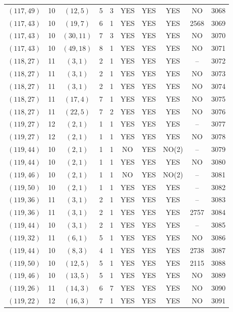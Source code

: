 \begin{longtable}{|c|c|c|c|c|c|c|c|c|c|}
$(117, 49)$ & 10 & $(12, 5)$ & 5 & 3 & YES & YES & YES & NO & 3068\\
$(117, 43)$ & 10 & $(19, 7)$ & 6 & 1 & YES & YES & YES & 2568 & 3069\\
$(117, 43)$ & 10 & $(30, 11)$ & 7 & 3 & YES & YES & YES & NO & 3070\\
$(117, 43)$ & 10 & $(49, 18)$ & 8 & 1 & YES & YES & YES & NO & 3071\\
$(118, 27)$ & 11 & $(3, 1)$ & 2 & 1 & YES & YES & YES & -- & 3072\\
$(118, 27)$ & 11 & $(3, 1)$ & 2 & 1 & YES & YES & YES & NO & 3073\\
$(118, 27)$ & 11 & $(3, 1)$ & 2 & 1 & YES & YES & YES & NO & 3074\\
$(118, 27)$ & 11 & $(17, 4)$ & 7 & 1 & YES & YES & YES & NO & 3075\\
$(118, 27)$ & 11 & $(22, 5)$ & 7 & 2 & YES & YES & YES & NO & 3076\\
$(119, 27)$ & 12 & $(2, 1)$ & 1 & 1 & YES & YES & YES & -- & 3077\\
$(119, 27)$ & 12 & $(2, 1)$ & 1 & 1 & YES & YES & YES & NO & 3078\\
$(119, 44)$ & 10 & $(2, 1)$ & 1 & 1 & NO & YES & NO(2) & -- & 3079\\
$(119, 44)$ & 10 & $(2, 1)$ & 1 & 1 & YES & YES & YES & NO & 3080\\
$(119, 46)$ & 10 & $(2, 1)$ & 1 & 1 & NO & YES & NO(2) & -- & 3081\\
$(119, 50)$ & 10 & $(2, 1)$ & 1 & 1 & YES & YES & YES & -- & 3082\\
$(119, 36)$ & 11 & $(3, 1)$ & 2 & 1 & YES & YES & YES & -- & 3083\\
$(119, 36)$ & 11 & $(3, 1)$ & 2 & 1 & YES & YES & YES & 2757 & 3084\\
$(119, 44)$ & 10 & $(3, 1)$ & 2 & 1 & YES & YES & YES & -- & 3085\\
$(119, 32)$ & 11 & $(6, 1)$ & 5 & 1 & YES & YES & YES & NO & 3086\\
$(119, 44)$ & 10 & $(8, 3)$ & 4 & 1 & YES & YES & YES & 2738 & 3087\\
$(119, 50)$ & 10 & $(12, 5)$ & 5 & 1 & YES & YES & YES & 2115 & 3088\\
$(119, 46)$ & 10 & $(13, 5)$ & 5 & 1 & YES & YES & YES & NO & 3089\\
$(119, 26)$ & 11 & $(14, 3)$ & 6 & 7 & YES & YES & YES & NO & 3090\\
$(119, 22)$ & 12 & $(16, 3)$ & 7 & 1 & YES & YES & YES & NO & 3091\\

\end{longtable}
